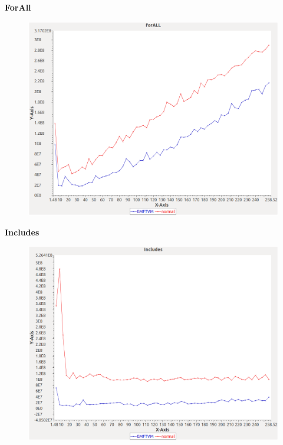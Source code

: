 \noindent\textbf{ForAll}

\begin{figure}[h]
\centering
\includegraphics[width=\textwidth]{../graphs/orderedset/forALL}
\end{figure}
\pagebreak

\noindent\textbf{Includes}

\begin{figure}[h]
\centering
\includegraphics[width=\textwidth]{../graphs/orderedset/Includes}
\end{figure}
\pagebreak

